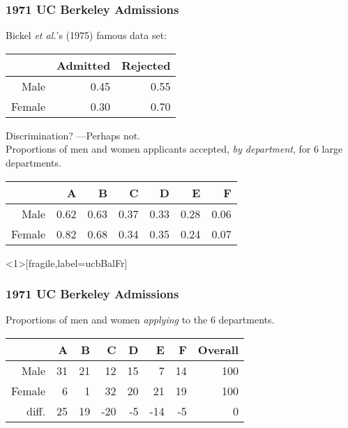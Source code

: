 \begin{frame}[fragile]
  \frametitle{1971 UC Berkeley Admissions}


Bickel \textit{et al.}'s (1975)%
famous data set:\\[1ex]

\begin{tabular}{rrr}
  \hline
 & Admitted & Rejected \\ 
  \hline
Male & 0.45 & 0.55 \\ 
  Female & 0.30 & 0.70 \\ 
   \hline
\end{tabular}
\vspace{2ex}

Discrimination? ---Perhaps not.\\[3ex]

Proportions of men and women applicants accepted, \textit{by department}, for 6 large departments.

\begin{tabular}{rrrrrrr}
  \hline
 & A & B & C & D & E & F \\ 
  \hline
Male & 0.62 & 0.63 & 0.37 & 0.33 & 0.28 & 0.06 \\ 
  Female & 0.82 & 0.68 & 0.34 & 0.35 & 0.24 & 0.07 \\ 
   \hline
\end{tabular}
\end{frame}

\begin{frame}<1>[fragile,label=ucbBalFr] 
  \frametitle{1971 UC Berkeley Admissions}

\bigskip

Proportions of men and women \textit{applying} to the 6 departments.\\
\begin{tabular}{rrrrrrrr}
  \hline
 & A & B & C & D & E & F & Overall \\ 
  \hline
Male & 31 & 21 & 12 & 15 & 7 & 14 & 100 \\ 
  Female & 6 & 1 & 32 & 20 & 21 & 19 & 100 \\ 
  diff. & 25 & 19 & -20 & -5 & -14 & -5 & 0 \\ 
   \hline
\end{tabular}\\
\vfill
\end{frame}

